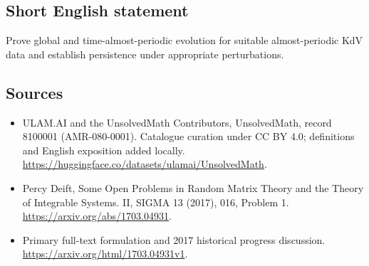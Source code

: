 \documentclass[11pt]{article}
\begin{document}
\subsection{Short English statement}
Prove global and time-almost-periodic evolution for suitable almost-periodic KdV data and establish persistence under appropriate perturbations.
\subsection{Sources}
\begin{itemize}
\item[\hypertarget{source:8100001:1}{S1}] ULAM.AI and the UnsolvedMath Contributors, UnsolvedMath, record 8100001 (AMR-080-0001). Catalogue curation under CC BY 4.0; definitions and English exposition added locally.
\url{https://huggingface.co/datasets/ulamai/UnsolvedMath}.
\item[\hypertarget{source:8100001:2}{S2}] Percy Deift, Some Open Problems in Random Matrix Theory and the Theory of Integrable Systems. II, SIGMA 13 (2017), 016, Problem 1.
\url{https://arxiv.org/abs/1703.04931}.
\item[\hypertarget{source:8100001:3}{S3}] Primary full-text formulation and 2017 historical progress discussion.
\url{https://arxiv.org/html/1703.04931v1}.
\end{itemize}
\label{end:8100001}
\end{document}

